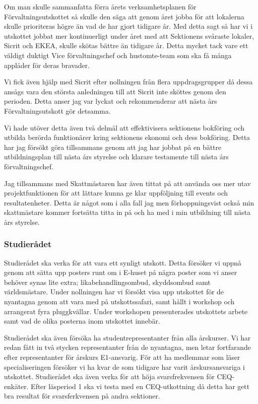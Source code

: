 \documentclass[../_main/handlingar.tex]{subfiles}
\begin{document}
Om man skulle sammanfatta förra årets verksamhetsplanen för Förvaltningsutskottet så skulle den säga att genom året jobba för att lokalerna skulle prioriteras högre än vad de har gjort tidigare år. Med detta sagt så har vi i utskottet jobbat mer kontinuerligt under året med att Sektionens svåraste lokaler, Sicrit och EKEA, skulle skötas bättre än tidigare år. Detta mycket tack vare ett väldigt duktigt Vice förvaltningschef och hustomte-team som ska få många applåder för deras bravader. 

Vi fick även hjälp med Sicrit efter nollningen från flera uppdragsgrupper då dessa ansågs vara den största anledningen till att Sicrit inte sköttes genom den perioden. Detta anser jag var lyckat och rekommenderar att nästa års Förvaltningsutskott gör detsamma.

Vi hade utöver detta även två delmål att effektivisera sektionens bokföring och utbilda berörda funktionärer kring sektionens ekonomi och dess bokföring. Detta har jag försökt göra tillsammans genom att jag har jobbat på en bättre utbildningsplan till nästa års styrelse och klarare testamente till nästa års förvaltningschef. 

Jag tillsammans med Skattmästaren har även tittat på att använda oss mer utav projektfunktionen för att lättare kunna ge klar uppföljning till events och resultatenheter. Detta är något som i alla fall jag men förhoppningsvist också min skattmästare kommer fortsätta titta in på och ha med i min utbildning till nästa års styrelse.


\subsubsection*{Studierådet}

Studierådet ska verka för att vara ett synligt utskott. Detta försöker vi uppnå genom att sätta upp posters runt om i E-huset på några poster som vi anser behöver synas lite extra; likabehandlingsombud, skyddsombud samt världsmästare. Under nollningen har vi försökt visa upp utskottet för de nyantagna genom att vara med på utskottssafari, samt hållt i workshop och arrangerat fyra pluggkvällar. Under workshopen presenterades utskottets arbete samt vad de olika posterna inom utskottet innebär. 

Studierådet ska även försöka ha studentrepresentanter från alla årskurser. Vi har redan fått in två stycken representanter från de nyantagna, men letar fortfarande efter representanter för årskurs E1-ansvarig. För att ha medlemmar som läser specialiseringen försöker vi ha kvar de som tidigare har varit årskursansvariga i utskottet. Studierådet ska även verka för att höja svarsfrekvensen för CEQ-enkäter. Efter läsperiod 1 ska vi testa med en CEQ-utkottning då detta har gett bra resultat för svarsferkvensen på andra sektioner.
\end{document}

